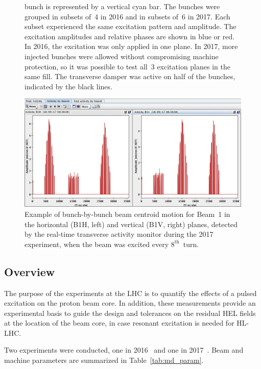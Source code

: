 \documentclass[%
 reprint,
 amsmath,amssymb,
 aps,
prstab,
longbibliography
]{revtex4-1}
\begin{document}
\begin{figure}
{    bunch is represented by a vertical cyan bar. The bunches were
    grouped in subsets of~4 in 2016 and in subsets of~6 in 2017. Each
    subset experienced the same excitation pattern and amplitude. The
    excitation amplitudes and relative phases are shown in blue or
    red. In 2016, the excitation was only applied in one plane. In
    2017, more injected bunches were allowed without compromising
    machine protection, so it was possible to test all~3 excitation
    planes in the same fill. The transverse damper was active on half
    of the bunches, indicated by the black lines.}
  \label{fig:fill}
\end{figure}

\begin{figure}
  \includegraphics[width=\textwidth]{bunchfilling_measured.png}	
  \caption{Example of bunch-by-bunch beam centroid motion for Beam~1
    in the horizontal (B1H, left) and vertical (B1V, right) planes,
    detected by the real-time transverse activity monitor during the
    2017 experiment, when the beam was excited every
    $8^\mathrm{th}$~turn.}
  \label{fig:fill_meas} 
\end{figure}

\subsection{Overview}
\label{sec:exp_sum}

The purpose of the experiments at the LHC is to quantify the effects
of a pulsed excitation on the proton beam core. In addition, these
measurements provide an experimental basis to guide the design and
tolerances on the residual HEL fields at the location of the beam
core, in case resonant excitation is needed for HL-LHC.

Two experiments were conducted, one in 2016~\cite{resexmd2016} and one
in 2017~\cite{resexmd2017}. Beam and machine parameters are summarized
in Table~\ref{tab:md_param}.
\end{document}
